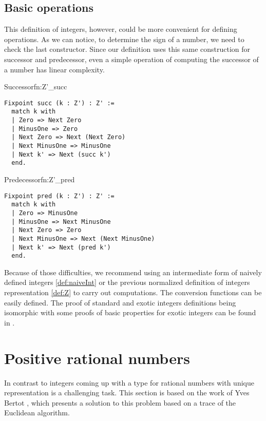 \subsection{Basic operations}
This definition of integers, however, could be more convenient for defining operations. As we can notice, to determine the sign of a number, we need to check the last constructor. Since our definition uses this same construction for successor and predecessor, even a simple operation of computing the successor of a number has linear complexity.
\begin{func}[D]{Successor}{fn:Z'_succ}
\begin{verbatim}
Fixpoint succ (k : Z') : Z' :=
  match k with
  | Zero => Next Zero
  | MinusOne => Zero
  | Next Zero => Next (Next Zero)
  | Next MinusOne => MinusOne
  | Next k' => Next (succ k')
  end.
\end{verbatim}
\end{func}
\begin{func}{Predecessor}{fn:Z'_pred}
\begin{verbatim}
Fixpoint pred (k : Z') : Z' :=
  match k with
  | Zero => MinusOne
  | MinusOne => Next MinusOne
  | Next Zero => Zero
  | Next MinusOne => Next (Next MinusOne)
  | Next k' => Next (pred k')
  end.
\end{verbatim}
\end{func}
Because of those difficulties, we recommend using an intermediate form of naively defined integers \ref{def:naiveInt} or the previous normalized definition of integers representation \ref{def:Z} to carry out computations. The conversion functions can be easily defined. The proof of standard and exotic integers definitions being isomorphic with some proofs of basic properties for exotic integers can be found in .
\section{Positive rational numbers}
In contrast to integers coming up with a type for rational numbers with unique representation is a challenging task. This section is based on the work of Yves Bertot \cite{Qplus}, which presents a solution to this problem based on a trace of the Euclidean algorithm.

